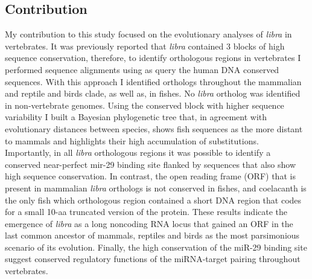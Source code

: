 		\subsection{Contribution}

			My contribution to this study focused on the evolutionary analyses of \textit{libra} in vertebrates. It was previously reported that \textit{libra} contained 3 blocks of high sequence conservation, therefore, to identify orthologous regions in vertebrates I performed sequence alignments using as query the human DNA conserved sequences. With this approach I identified orthologs throughout the mammalian and reptile and birds clade, as well as, in fishes. No \textit{libra} ortholog was identified in non-vertebrate genomes. Using the conserved block with higher sequence variability I built a Bayesian phylogenetic tree that, in agreement with evolutionary distances between species, shows fish sequences as the more distant to mammals and highlights their high accumulation of substitutions.\\

			Importantly, in all \textit{libra} orthologous regions it was possible to identify a conserved near-perfect mir-29 binding site flanked by sequences that also show high sequence conservation. In contrast, the open reading frame (ORF) that is present in mammalian \textit{libra} orthologs is not conserved in fishes, and coelacanth is the only fish which orthologous region contained a short DNA region that codes for a small 10-aa truncated version of the protein. These results indicate the emergence of \textit{libra} as a long noncoding RNA locus that gained an ORF in the last common ancestor of mammals, reptiles and birds as the most parsimonious scenario of its evolution. Finally, the high conservation of the miR-29 binding site suggest conserved regulatory functions of the miRNA-target pairing throughout vertebrates.\\

		

		


